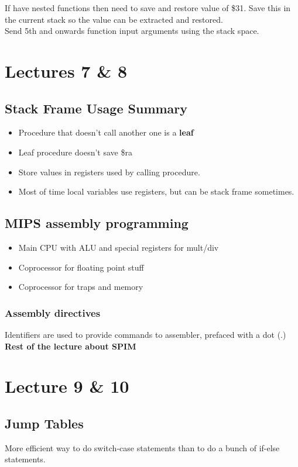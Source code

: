 \documentclass{article}
\begin{document}
		If have nested functions then need to save and restore value of \$31. Save this in the current stack so the value can be extracted and restored.\\

		Send 5th and onwards function input arguments using the stack space.
		

\section*{Lectures 7 \& 8}
	\subsection*{Stack Frame Usage Summary}
		\begin{itemize}
			\item Procedure that doesn't call another one is a \textbf{leaf}
			\item Leaf procedure doesn't save \$ra
			\item Store values in registers used by calling procedure.
			\item Most of time local variables use registers, but can be stack frame sometimes.
		\end{itemize}

	\subsection*{MIPS assembly programming}
		\begin{itemize}
			\item Main CPU with ALU and special registers for mult/div
			\item Coprocessor for floating point stuff
			\item Coprocessor for traps and memory
		\end{itemize}

		\subsubsection*{Assembly directives}
		Identifiers are used to provide commands to assembler, prefaced with a dot (.)\\

	\textbf{Rest of the lecture about SPIM}

\newpage
\section*{Lecture 9 \& 10}
	\subsection*{Jump Tables}
		More efficient way to do switch-case statements than to do a bunch of if-else statements.
\end{document}
